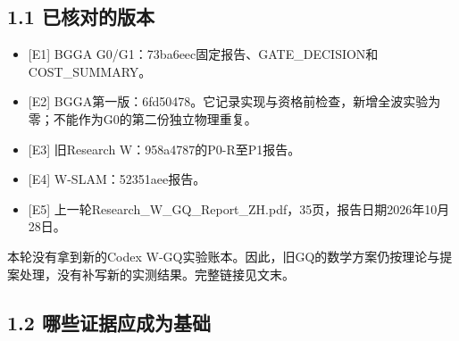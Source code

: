 \documentclass[
  10pt,
  a4paper,
]{article}
\providecommand{\tightlist}{%
  \setlength{\itemsep}{0pt}\setlength{\parskip}{0pt}}
\providecommand{\tightlist}{\setlength{\itemsep}{1pt}\setlength{\parskip}{1pt}}
\begin{document}
\hypertarget{ux5df2ux6838ux5bf9ux7684ux7248ux672c}{%
\subsection{1.1
已核对的版本}\label{ux5df2ux6838ux5bf9ux7684ux7248ux672c}}

\begin{itemize}
\tightlist
\item
  {[}E1{]} BGGA G0/G1：73ba6eec固定报告、GATE\_DECISION和COST\_SUMMARY。
\item
  {[}E2{]}
  BGGA第一版：6fd50478。它记录实现与资格前检查，新增全波实验为零；不能作为G0的第二份独立物理重复。
\item
  {[}E3{]} 旧Research W：958a4787的P0-R至P1报告。
\item
  {[}E4{]} W-SLAM：52351aee报告。
\item
  {[}E5{]}
  上一轮Research\_W\_GQ\_Report\_ZH.pdf，35页，报告日期2026年10月28日。
\end{itemize}

本轮没有拿到新的Codex
W-GQ实验账本。因此，旧GQ的数学方案仍按理论与提案处理，没有补写新的实测结果。完整链接见文末。

\hypertarget{ux54eaux4e9bux8bc1ux636eux5e94ux6210ux4e3aux57faux7840}{%
\subsection{1.2
哪些证据应成为基础}\label{ux54eaux4e9bux8bc1ux636eux5e94ux6210ux4e3aux57faux7840}}
\end{document}
